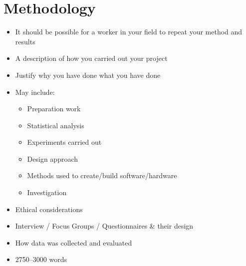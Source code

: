 \section{Methodology}
\begin{itemize}
\item It should be possible for a worker in your field to repeat your method and results
\item A description of how you carried out your project
\item Justify why you have done what you have done
\item May include:
\begin{itemize}
\item Preparation work
\item Statistical analysis
\item Experiments carried out
\item Design approach
\item Methods used to create/build software/hardware
\item Investigation
\end{itemize}
\item Ethical considerations
\item Interview / Focus Groups / Questionnaires \& their design
\item How data was collected and evaluated
\item 2750–3000 words
\end{itemize}